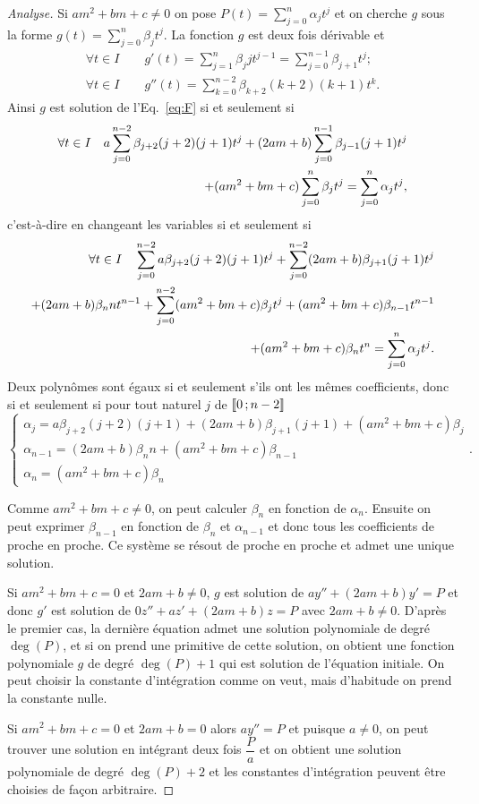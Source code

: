 \begin{proof}[Analyse]
Si $am^2+bm+c \neq 0$ on pose $P(t)=\sum_{j=0}^{n} \alpha_j t^j$ et on cherche $g$ sous la forme $g(t)=\sum_{j=0}^{n} \beta_j t^j$. La fonction $g$ est deux fois dérivable et 
\begin{gather}
\forall t \in I \qquad g'(t)=\sum_{j=1}^n \beta_j j t^{j-1}=\sum_{j=0}^{n-1} \beta_{j+1} t^j; \\
\forall t \in I \qquad g''(t)=\sum_{k=0}^{n-2} \beta_{k+2} (k+2)(k+1) t^k.
\end{gather}
 Ainsi $g$ est solution de l'Eq.~\eqref{eq:F} si et seulement si 
  \begin{align}
    \forall t \in I \quad  a \sum_{j=0}^{n-2} \beta_{j+2} (j+2)(j+1)t^j+ (2am+b) \sum_{j=0}^{n-1} \beta_{j-1}(j+1)t^j \notag \\
      + (am^2+bm+c)\sum_{j=0}^{n} \beta_j t^j  =  \sum_{j=0}^{n} \alpha_j t^j,
\end{align}
c'est-à-dire en changeant les variables si et seulement si
\begin{align}
    \forall t \in I \quad \sum_{j=0}^{n-2} a\beta_{j+2} (j+2)(j+1)t^j +  \sum_{j=0}^{n-2}(2am+b)\beta_{j+1}(j+1)t^j  \notag \\ 
    + (2am+b)\beta_n nt^{n-1}+ \sum_{j=0}^{n-2} (am^2+bm+c) \beta_j t^j  + (am^2+bm+c)\beta_{n-1} t^{n-1} \notag \\ 
    + (am^2+bm+c) \beta_nt^n=\sum_{j=0}^{n} \alpha_j t^j.
  \end{align}
Deux polynômes sont égaux si et seulement s'ils ont les mêmes coefficients, donc si et seulement si pour tout naturel $j$ de $\mathopen{\llbracket}0\mathclose{}\mathpunct{};n-2\mathclose{\rrbracket}$
\begin{equation}
  \begin{cases}
    \alpha_j= a \beta_{j+2}(j+2)(j+1)+(2am+b)\beta_{j+1}(j+1)+(am^2+bm+c)\beta_j\\ 
    \alpha_{n-1}= (2am+b)\beta_n n +(am^2+bm+c)\beta_{n-1} \\ 
    \alpha_n=(am^2+bm+c) \beta_n
  \end{cases}.
\end{equation}

Comme $am^2+bm+c \neq 0$, on peut calculer $\beta_n$ en fonction de $\alpha_n$. Ensuite on peut exprimer $\beta_{n-1}$ en fonction de $\beta_{n}$ et $\alpha_{n-1}$ et donc tous les coefficients de proche en proche. Ce système se résout de proche en proche et admet une unique solution.

Si $am^2+bm+c=0$ et $2am+b \neq 0$, $g$ est solution de $ay''+(2am+b)y'=P$ et donc $g'$ est solution de $0z''+az'+(2am+b)z=P$ avec $2am+b \neq 0$. D'après le premier cas, la dernière équation admet une solution polynomiale de degré $\deg(P)$, et si on prend une primitive de cette solution, on obtient une fonction polynomiale $g$ de degré $\deg(P) + 1$ qui est solution de l'équation initiale. On peut choisir la constante d'intégration comme on veut, mais d'habitude on prend la constante nulle.

Si $am^2+bm+c = 0$ et $2am+b = 0$ alors $ay''=P$ et puisque $a \neq 0$, on peut trouver une solution en intégrant deux fois $\dfrac{P}{a}$ et on obtient une solution polynomiale de degré $\deg(P)+2$ et les constantes d'intégration peuvent être choisies de façon arbitraire.
\end{proof}
